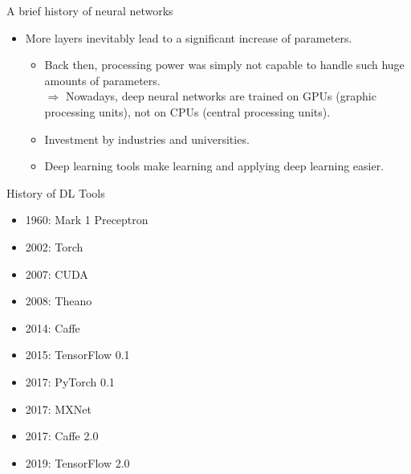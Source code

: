 \begin{vbframe}{A brief history of neural networks}
\begin{itemize}
\begin{itemize}
    \vspace{2mm}
    \item More layers inevitably lead to a significant increase of parameters.
      \begin{itemize}
        \item Back then, processing power was simply not capable to handle such huge amounts of parameters. \\
        $\Rightarrow$ Nowadays, deep neural networks are trained on GPUs (graphic processing units), not on CPUs (central processing units).
        \item Investment by industries and universities.
        \item Deep learning tools make learning and applying deep learning easier.
      \end{itemize}
  \end{itemize}
\end{itemize}
\framebreak
    History of DL Tools
    \begin{itemize}
    \item 1960: Mark 1 Preceptron
    \item 2002: Torch
    \item 2007: CUDA
    \item 2008: Theano
    \item 2014: Caffe
    \item 2015: TensorFlow 0.1
    \item 2017: PyTorch 0.1
    \item 2017: MXNet
    \item 2017: Caffe 2.0
    \item 2019: TensorFlow 2.0
  \end{itemize}
  \framebreak
  \vspace{15mm}
  \begin{figure}
    \centering

\end{figure}
\end{vbframe}
